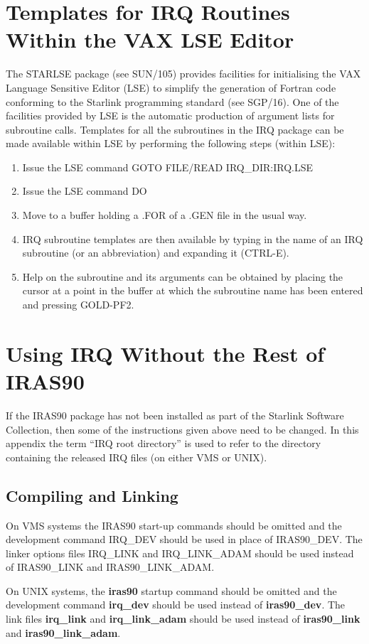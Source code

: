 \section {Templates for IRQ Routines Within the VAX LSE Editor}
The STARLSE package (see SUN/105) provides facilities for initialising the VAX
Language Sensitive Editor (LSE) to simplify the generation of Fortran
code conforming to the Starlink programming standard (see SGP/16). One of the
facilities provided by LSE is the automatic production of argument lists for
subroutine calls. Templates for all the subroutines in the IRQ package can be
made available within LSE by performing the following steps (within LSE):
\begin{enumerate}
\item Issue the LSE command GOTO FILE/READ IRQ\_DIR:IRQ.LSE
\item Issue the LSE command DO
\item Move to a buffer holding a .FOR of a .GEN file in the usual way.
\item IRQ subroutine templates are then available by typing in the name of an
IRQ subroutine (or an abbreviation) and expanding it (CTRL-E).
\item Help on the subroutine and its arguments can be obtained by placing the
cursor at a point in the buffer at which the subroutine name has been entered
and pressing GOLD-PF2.
\end{enumerate}

\section {Using IRQ Without the Rest of IRAS90}
\label {APP:NOSTAR}
If the IRAS90 package has not been installed as part of the Starlink
Software Collection, then some of the instructions given above need to be
changed. In this appendix the term ``IRQ root directory'' is used to refer to
the directory containing the released IRQ files (on either VMS or UNIX).

\subsection{Compiling and Linking}
On VMS systems the IRAS90 start-up commands should be omitted and the
development command IRQ\_DEV should be used in place of IRAS90\_DEV. The
linker options files IRQ\_LINK and IRQ\_LINK\_ADAM should be used instead
of IRAS90\_LINK and IRAS90\_LINK\_ADAM.

On UNIX systems, the {\bf iras90} startup command should be omitted and the
development command {\bf irq\_dev} should be used instead of {\bf iras90\_dev}.
The link files {\bf irq\_link} and {\bf irq\_link\_adam} should be used instead
of {\bf iras90\_link} and {\bf iras90\_link\_adam}.

